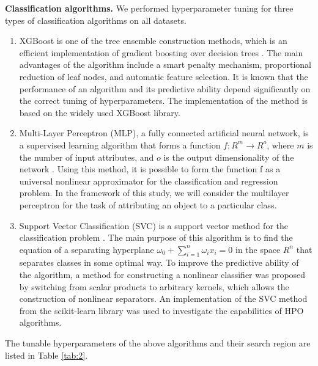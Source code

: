 \documentclass[preprint,12pt]{elsarticle}
\begin{document}
\textbf{Classification algorithms.} We performed hyperparameter tuning for three types of classification algorithms on all datasets.
\begin{enumerate}
	\item XGBoost is one of the tree ensemble construction methods, which is an efficient implementation of gradient boosting over decision trees \cite{XGBoost2016}. The main advantages of the algorithm include a smart penalty mechanism, proportional reduction of leaf nodes, and automatic feature selection. It is known that the performance of an algorithm and its predictive ability depend significantly on the correct tuning of hyperparameters. The implementation of the method is based on the widely used XGBoost library.
 \item Multi-Layer Perceptron (MLP), a fully connected artificial neural network, is a supervised learning algorithm that forms a function $f : R^m \to R^o$, where $m$ is the number of input attributes, and $o$ is the output dimensionality of the network \cite{GARDNER19982627}. Using this method, it is possible to form the function f as a universal nonlinear approximator for the classification and regression problem. In the framework of this study, we will consider the multilayer perceptron for the task of attributing an object to a particular class.
 \item Support Vector Classification (SVC) is a support vector method for the classification problem \cite{SVC}. The main purpose of this algorithm is to find the equation of a separating hyperplane $\omega_0 + \sum_{i=1}^n \omega_i x_i=0$ in the space $R^n$ that separates classes in some optimal way. To improve the predictive ability of the algorithm, a method for constructing a nonlinear classifier was proposed by switching from scalar products to arbitrary kernels, which allows the construction of nonlinear separators. An implementation of the SVC method from the scikit-learn library was used to investigate the capabilities of HPO algorithms.

\end{enumerate}

The tunable hyperparameters of the above algorithms and their search region are listed in Table \ref{tab:2}.
\end{document}
